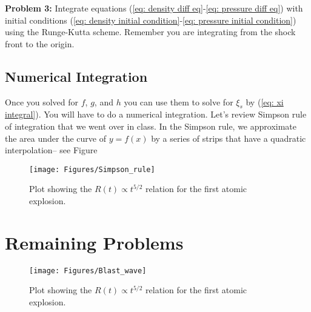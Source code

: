 \documentclass{article}
\begin{document}
\bigskip
\noindent
\textbf{Problem 3:} Integrate equations (\ref{eq: density diff eq}-\ref{eq: pressure diff eq}) with initial conditions (\ref{eq: density initial condition}-\ref{eq: pressure initial condition}) using the Runge-Kutta scheme. Remember you are integrating from the shock front to the origin.

\subsection{Numerical Integration}
Once you solved for $f$, $g$, and $h$ you can use them to solve for $\xi_s$ by (\ref{eq: xi integral}). You will have to do a numerical integration. Let's review Simpson rule of integration that we went over in class. In the Simpson rule, we approximate the area under the curve of $y=f(x)$ by a series of strips that have a quadratic interpolation-- see Figure 
\begin{figure}[h!]
\begin{center}
\texttt{[image: Figures/Simpson\_rule]}
\end{center}
\caption{Plot showing the $R(t) \propto t^{5/2}$ relation for the first atomic explosion.}
\label{fig: Simpson rule}
\end{figure}

\section{Remaining Problems}

\begin{figure}[h!]
\begin{center}
\texttt{[image: Figures/Blast\_wave]}
\end{center}
\caption{Plot showing the $R(t) \propto t^{5/2}$ relation for the first atomic explosion.}
\label{fig: Blast wave solution}
\end{figure}




%
%
\end{document}
